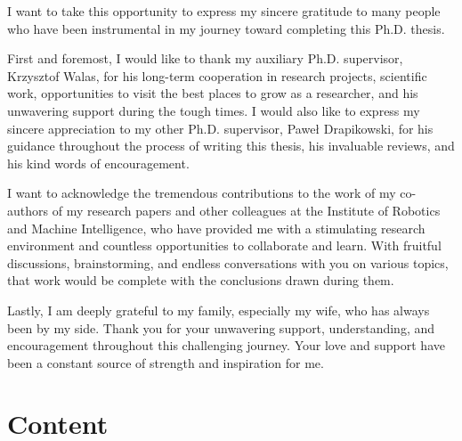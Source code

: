 \documentclass[a4paper, 10pt, twoside]{report}
\begin{document}
I want to take this opportunity to express my sincere gratitude to many people who have been instrumental in my journey toward completing this Ph.D. thesis.

First and foremost, I would like to thank my auxiliary Ph.D. supervisor, Krzysztof Walas, for his long-term cooperation in research projects, scientific work, opportunities to visit the best places to grow as a researcher, and his unwavering support during the tough times. I would also like to express my sincere appreciation to my other Ph.D. supervisor, Paweł Drapikowski, for his guidance throughout the process of writing this thesis, his invaluable reviews, and his kind words of encouragement.

I want to acknowledge the tremendous contributions to the work of my co-authors of my research papers and other colleagues at the Institute of Robotics and Machine Intelligence, who have provided me with a stimulating research environment and countless opportunities to collaborate and learn. With fruitful discussions, brainstorming, and endless conversations with you on various topics, that work would be complete with the conclusions drawn during them.

Lastly, I am deeply grateful to my family, especially my wife, who has always been by my side. Thank you for your unwavering support, understanding, and encouragement throughout this challenging journey. Your love and support have been a constant source of strength and inspiration for me.

\printglossary[title=Abbreviations, type=\acronymtype,style=long,nonumberlist]

\chapter*{Content}
\label{sec:content}
\end{document}
